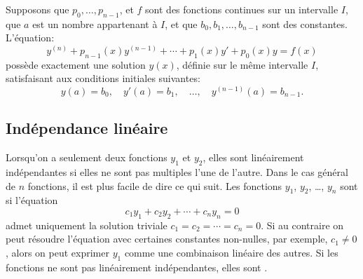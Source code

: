 \begin{theorem}
	Supposons que $p_0,\ldots, p_{n-1}$, et $f$ sont des fonctions continues sur un intervalle $I$,
	que $a$ est un nombre appartenant à $I$,
	et que $b_0, b_1, \ldots, b_{n-1}$ sont des constantes.
	L'équation: 
	\begin{equation*} %
		y^{(n)} + p_{n-1}(x)y^{(n-1)} + \cdots + p_1(x) y' + p_0(x) y = f(x) 
	\end{equation*}
	possède exactement une solution $y(x)$, définie sur le même intervalle $I$, 
	satisfaisant aux conditions initiales suivantes: 
	\begin{equation*}
		y(a) = b_0, \quad y'(a) = b_1, \quad \ldots, \quad y^{(n-1)}(a) = b_{n-1} .
	\end{equation*}
\end{theorem}




\subsection{Indépendance linéaire}

Lorsqu'on a seulement deux fonctions $y_1$ et $y_2$, elles sont linéairement indépendantes si elles ne sont pas multiples l'une de l'autre. Dans le cas général de $n$ fonctions, il est plus facile de dire ce qui suit. 
Les fonctions  $y_1$, $y_2$, \ldots, $y_n$ sont \emph{} si l'équation
\begin{equation*}
	c_1 y_1 + c_2 y_2 + \cdots + c_n y_n = 0 
\end{equation*}
admet uniquement la solution triviale $c_1 = c_2 = \cdots = c_n = 0$.  
Si au contraire on peut résoudre l'équation avec certaines constantes non-nulles, par exemple,  $c_1 \not= 0$, alors on peut exprimer $y_1$ comme une combinaison linéaire des autres. 
Si les fonctions ne sont pas linéairement indépendantes, elles sont  \emph{}.

